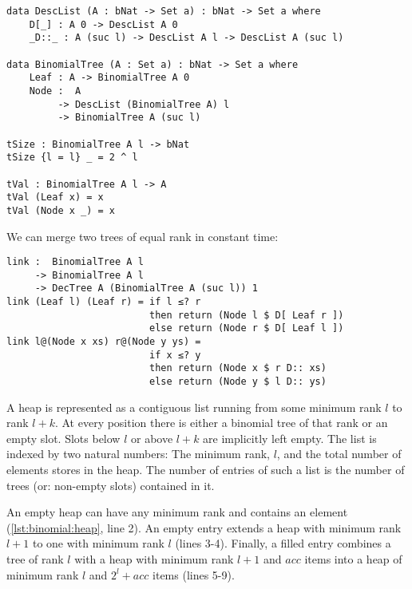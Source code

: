 \begin{lstlisting}[caption={Definition of a binomial tree},label={lst:binomial:tree},emph={DescList,BinomialTree,Leaf,Node}]
data DescList (A : bNat -> Set a) : bNat -> Set a where
    D[_] : A 0 -> DescList A 0
    _D::_ : A (suc l) -> DescList A l -> DescList A (suc l)

data BinomialTree (A : Set a) : bNat -> Set a where
    Leaf : A -> BinomialTree A 0
    Node :  A
         -> DescList (BinomialTree A) l
         -> BinomialTree A (suc l)

tSize : BinomialTree A l -> bNat
tSize {l = l} _ = 2 ^ l

tVal : BinomialTree A l -> A
tVal (Leaf x) = x
tVal (Node x _) = x
\end{lstlisting}

We can merge two trees of equal rank in constant time:

\begin{lstlisting}[caption={Merging two trees},label={lst:binomial:link},emph={link,Leaf,Node,if,then,else}]
link :  BinomialTree A l
     -> BinomialTree A l
     -> DecTree A (BinomialTree A (suc l)) 1
link (Leaf l) (Leaf r) = if l ≤? r
                         then return (Node l $ D[ Leaf r ])
                         else return (Node r $ D[ Leaf l ])
link l@(Node x xs) r@(Node y ys) =
                         if x ≤? y
                         then return (Node x $ r D:: xs)
                         else return (Node y $ l D:: ys)
\end{lstlisting}

A heap is represented as a contiguous list running from some minimum rank $l$ to rank $l + k$. At every position there is either a binomial tree of that rank or an empty slot. Slots below $l$ or above $l + k$ are implicitly left empty. The list is indexed by two natural numbers: The minimum rank, $l$, and the total number of elements stores in the heap. The number of entries of such a list is the number of trees (or: non-empty slots) contained in it.

An empty heap can have any minimum rank and contains an element (\autoref{lst:binomial:heap}, line 2). An empty entry extends a heap with minimum rank $l+1$ to one with minimum rank $l$ (lines 3-4). Finally, a filled entry combines a tree of rank $l$ with a heap with minimum rank $l+1$ and $acc$ items into a heap of minimum rank $l$ and $2^l + acc$ items (lines 5-9).

